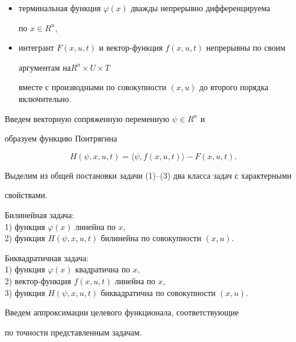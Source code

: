 \begin{itemize}


\item[1)] терминальная функция $\varphi(x)$ дважды непрерывно дифференцируема 


по $x\in R^n$,


\item[2)] интегрант $F(x,u,t)$ и вектор-функция $f(x,u,t)$ непрерывны по своим 


аргументам на\linebreak $R^n\times U\times T$


вместе с производными по совокупности $(x,u)$ до второго порядка включительно.


\end{itemize}





Введем векторную сопряженную переменную $\psi\in R^n$ и 


образуем функцию Понтрягина


$$


H(\psi,x,u,t)=\langle \psi,f(x,u,t)\rangle - F(x,u,t).


$$


Выделим из общей постановки задачи (1)--(3) два класса задач с характерными 


свойствами.





Билинейная задача:\\


1) функция $\varphi(x)$ линейна по $x$,\\


2) функция $H(\psi,x,u,t)$ билинейна по совокупности $(x,u)$.





Биквадратичная задача:\\


1) функция $\varphi(x)$ квадратична по $x$,\\


2) вектор-функция $f(x,u,t)$ линейна по $x$,\\


3) функция $H(\psi,x,u,t)$ биквадратична по совокупности $(x,u)$.





Введем аппроксимации целевого функционала, соответствующие 


по точности представленным задачам.





